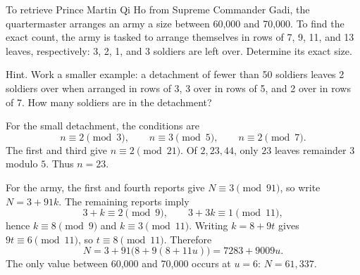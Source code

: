 To retrieve Prince Martin Qi Ho from Supreme Commander Gadi, the quartermaster arranges an army a size between 60,000 and 70,000. To find the exact count, the army is tasked to arrange themselves in rows of 7, 9, 11, and 13 leaves, respectively: 3, 2, 1, and 3 soldiers are left over. Determine its exact size.

Hint. Work a smaller example: a detachment of fewer than 50 soldiers leaves 2 soldiers over when arranged in rows of 3, 3 over in rows of 5, and 2 over in rows of 7. How many soldiers are in the detachment?

\begin{solution}
For the small detachment, the conditions are
\[
 n\equiv 2\pmod 3,\qquad n\equiv 3\pmod 5,\qquad
 n\equiv 2\pmod 7.
\]
The first and third give $n\equiv 2\pmod{21}$. Of $2,23,44$,
only $23$ leaves remainder $3$ modulo $5$. Thus $\boxed{n=23}$.

For the army, the first and fourth reports give $N\equiv3\pmod{91}$,
so write $N=3+91k$. The remaining reports imply
\[
 3+k\equiv2\pmod9,\qquad 3+3k\equiv1\pmod{11},
\]
hence $k\equiv8\pmod9$ and $k\equiv3\pmod{11}$.
Writing $k=8+9t$ gives $9t\equiv6\pmod{11}$, so
$t\equiv8\pmod{11}$. Therefore
\[
 N=3+91\bigl(8+9(8+11u)\bigr)=7283+9009u.
\]
The only value between 60,000 and 70,000 occurs at $u=6$:
$\boxed{N=61{,}337}$.
\end{solution}
